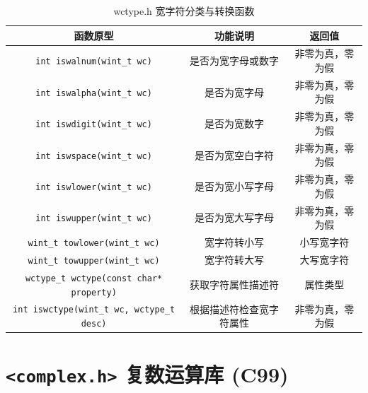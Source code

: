 \begin{table}[H]
\centering
\small
\renewcommand{\arraystretch}{1.5}
\begin{tabulary}{\linewidth}{CCC}
\toprule
\textbf{函数原型} & \textbf{功能说明} & \textbf{返回值} \\ \midrule
\texttt{int iswalnum(wint\_t wc)} & 是否为宽字母或数字 & 非零为真，零为假 \\ 
\texttt{int iswalpha(wint\_t wc)} & 是否为宽字母 & 非零为真，零为假 \\ 
\texttt{int iswdigit(wint\_t wc)} & 是否为宽数字 & 非零为真，零为假 \\ 
\texttt{int iswspace(wint\_t wc)} & 是否为宽空白字符 & 非零为真，零为假 \\ 
\texttt{int iswlower(wint\_t wc)} & 是否为宽小写字母 & 非零为真，零为假 \\ 
\texttt{int iswupper(wint\_t wc)} & 是否为宽大写字母 & 非零为真，零为假 \\ 
\texttt{wint\_t towlower(wint\_t wc)} & 宽字符转小写 & 小写宽字符 \\ 
\texttt{wint\_t towupper(wint\_t wc)} & 宽字符转大写 & 大写宽字符 \\ 
\texttt{wctype\_t wctype(const char* property)} & 获取字符属性描述符 & 属性类型 \\ 
\texttt{int iswctype(wint\_t wc, wctype\_t desc)} & 根据描述符检查宽字符属性 & 非零为真，零为假 \\ \bottomrule
\end{tabulary}
\caption{wctype.h 宽字符分类与转换函数}
\label{tab:wctype}
\end{table}

\section{\texorpdfstring{\texttt{<complex.h>} 复数运算库 (C99)}{<complex.h> 复数运算库 (C99)}}

